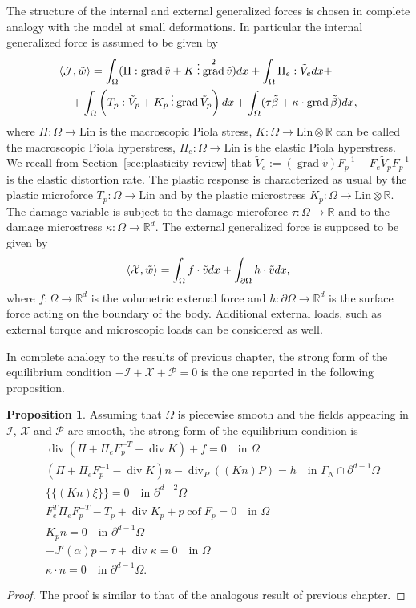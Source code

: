 \documentclass[a4paper,10pt,twoside]{amsbook}
\numberwithin{section}{chapter}
\numberwithin{equation}{chapter}
\theoremstyle{definition}
\newtheorem{prop}{Proposition}[chapter]
\DeclareMathOperator{\cof}{cof}
\DeclareMathOperator{\diver}{div}
\DeclareMathOperator{\grad}{grad}
\DeclarePairedDelimiter{\dual}{\langle}{\rangle}
\newcommand{\threedots}{\mathbin{\vdots}}
\begin{document}
The structure of the internal and external generalized forces is chosen in complete analogy with the model at small deformations. In particular the internal generalized force is assumed to be given by
\[
\begin{multlined}
\dual{\mathcal{J},\tilde w}=\int_\Omega(\Pi:\grad\tilde v+K\threedots\grad^2\tilde v)dx+\int_\Omega \Pi_e:\tilde V_edx+\\
+\int_\Omega\left(T_p:\tilde V_p+K_p\threedots\grad\tilde V_p\right)dx+\int_\Omega(\tau\tilde\beta+\kappa\cdot\grad\tilde\beta)dx,
\end{multlined}
\]
where $\Pi\colon\Omega\to\text{Lin}$ is the macroscopic Piola stress, $K\colon\Omega\to\text{Lin}\otimes\mathbb{R}$ can be called the macroscopic Piola hyperstress, $\Pi_e\colon\Omega\to\text{Lin}$ is the elastic Piola hyperstress. We recall from Section~\ref{sec:plasticity-review} that $\tilde V_e:=(\grad\tilde v)F_p^{-1}-F_e\tilde V_pF_p^{-1}$ is the elastic distortion rate. The plastic response is characterized as usual by the plastic microforce $T_p\colon\Omega\to\text{Lin}$ and by the plastic microstress $K_p\colon\Omega\to\text{Lin}\otimes\mathbb{R}$. The damage variable is subject to the damage microforce $\tau\colon\Omega\to\mathbb{R}$ and to the damage microstress $\kappa\colon\Omega\to\mathbb{R}^d$. The external generalized force is supposed to be given by
\[
\dual{\mathcal{X},\tilde w}=\int_\Omega f\cdot\tilde vdx+\int_{\partial\Omega}h\cdot\tilde vdx,
\]
where $f\colon\Omega\to\mathbb{R}^d$ is the volumetric external force and $h\colon\partial\Omega\to\mathbb{R}^d$ is the surface force acting on the boundary of the body. Additional external loads, such as external torque and microscopic loads can be considered as well.

In complete analogy to the results of previous chapter, the strong form of the equilibrium condition $-\mathcal{I}+\mathcal{X}+\mathcal{P}=0$ is the one reported in the following proposition.
\begin{prop}
\label{prop:strong-form-pressure-large}
Assuming that $\Omega$ is piecewise smooth and the fields appearing in $\mathcal{I}$, $\mathcal{X}$ and $\mathcal{P}$ are smooth, the strong form of the equilibrium condition is
\begin{align*}
&\diver(\Pi+\Pi_eF_p^{-T}-\diver K)+f=0\quad\text{in $\Omega$} \\
&(\Pi+\Pi_eF_p^{-1}-\diver K)n-\diver_P((Kn)P)=h\quad\text{in $\Gamma_N\cap\partial^{d-1}\Omega$} \\
&\{\!\!\{(Kn)\xi\}\!\!\}=0\quad\text{in $\partial^{d-2}\Omega$} \\
&F_e^T\Pi_eF_p^{-T}-T_p+\diver K_p+p\cof F_p=0\quad\text{in $\Omega$} \\
&K_p n=0\quad\text{in $\partial^{d-1}\Omega$} \\
&-J'(\alpha)p-\tau+\diver\kappa=0\quad\text{in $\Omega$} \\
&\kappa\cdot n=0\quad\text{in $\partial^{d-1}\Omega$}.
\end{align*}
\end{prop}
\begin{proof}
The proof is similar to that of the analogous result of previous chapter.
\end{proof}
\end{document}
